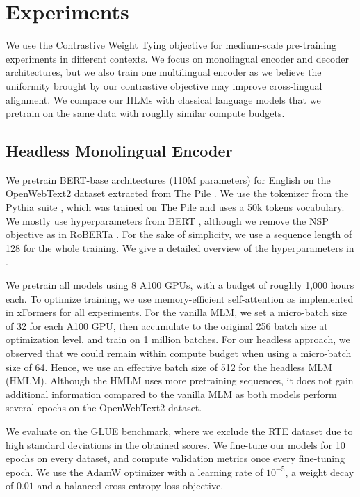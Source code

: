 \section{Experiments}
\label{sec:experiments}
We use the Contrastive Weight Tying objective for medium-scale pre-training experiments in different contexts. We focus on monolingual encoder and decoder architectures, but we also train one multilingual encoder as we believe the uniformity brought by our contrastive objective may improve cross-lingual alignment.
We compare our HLMs with classical language models that we pretrain on the same data with roughly similar compute budgets.

\subsection{Headless Monolingual Encoder}
\label{sec:mono_encoder}
We pretrain BERT-base architectures (110M parameters) for English on the OpenWebText2 dataset extracted from The Pile \citep{gao2020pile}. We use the tokenizer from the Pythia suite \citep{biderman2023pythia}, which was trained on The Pile and uses a 50k tokens vocabulary.
We mostly use hyperparameters from BERT \citep{devlin-etal-2019-bert}, although we remove the NSP objective as in RoBERTa \citep{roberta}. For the sake of simplicity, we use a sequence length of 128 for the whole training. We give a detailed overview of the hyperparameters in .

We pretrain all models using 8 A100 GPUs, with a budget of roughly 1,000 hours each. To optimize training, we use memory-efficient self-attention as implemented in xFormers \citep{xFormers2022} for all experiments. For the vanilla MLM, we set a micro-batch size of 32 for each A100 GPU, then accumulate to the original 256 batch size at optimization level, and train on 1 million batches. For our headless approach, we observed that we could remain within compute budget when using a micro-batch size of 64. Hence, we use an effective batch size of 512 for the headless MLM (HMLM). Although the HMLM uses more pretraining sequences, it does not gain additional information compared to the vanilla MLM as both models perform several epochs on the OpenWebText2 dataset.


We evaluate on the GLUE benchmark, where we exclude the RTE dataset due to high standard deviations in the obtained scores. We fine-tune our models for 10 epochs on every dataset, and compute validation metrics once every fine-tuning epoch. We use the AdamW optimizer with a learning rate of $10^{-5}$, a weight decay of $0.01$ and a balanced cross-entropy loss objective. 

